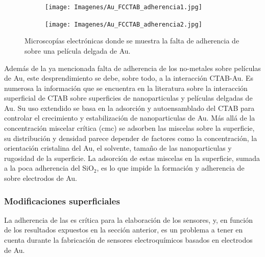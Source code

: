 				\begin{figure}[th]
		 	   	    \begin{subfigure}[t]{0.49\textwidth}
			        	\texttt{[image: Imagenes/Au\_FCCTAB\_adherencia1.jpg]}
			       		\end{subfigure}
					\begin{subfigure}[t]{0.49\textwidth}
			 	   	    \texttt{[image: Imagenes/Au\_FCCTAB\_adherencia2.jpg]}
			       		\end{subfigure}
					 \caption[Adherencia de CTAB sobre electrodos.]{Microscopías electrónicas donde se muestra la falta de adherencia de \pdmC \space sobre una película delgada de Au.}
					 \label{fig:CTAB_adherencia}	
				     \end{figure}
			Además de la ya mencionada falta de adherencia de los no-metales sobre películas de Au, este desprendimiento se debe, sobre todo, a la interacción CTAB-Au. Es numerosa la información que se encuentra en la literatura sobre la interacción superficial de CTAB sobre superficies de nanoparticulas y películas delgadas de Au\cite{Cheng2003,Smith2008,Lim2014,Meena2013,Wang2013,Hamon2009}. Su uso extendido se basa en la adsorción y autoensamblado del CTAB para controlar el crecimiento y estabilización de nanoparticulas de Au. Más allá de la concentración miscelar crítica (cmc) se adsorben las miscelas sobre la superficie, su distribución y densidad parece depender de factores como la concentración, la orientación cristalina del Au, el solvente, tamaño de las nanoparticulas y rugosidad de la superficie\cite{Meena2013,Lim2014}. La adsorción de estas miscelas en la superficie, sumada a la poca adherencia del SiO$_2$, es lo que impide la formación y adherencia de \pdmC\space sobre electrodos de Au.
		
							
		\subsubsection{Modificaciones superficiales}\label{sec:adherencia}

			La adherencia de las \pdm\space es crítica para la elaboración de los sensores, y, en función de los resultados expuestos en la sección anterior, es un problema a tener en cuenta durante la fabricación de sensores electroquímicos basados en electrodos de Au.


